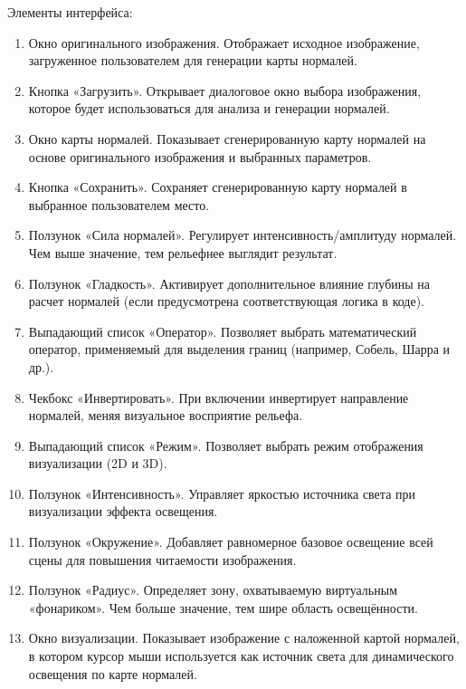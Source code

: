 Элементы интерфейса:
\begin{enumerate}
	\item Окно оригинального изображения. Отображает исходное изображение, загруженное пользователем для генерации карты нормалей.
	\item Кнопка «Загрузить». Открывает диалоговое окно выбора изображения, которое будет использоваться для анализа и генерации нормалей.	
	\item Окно карты нормалей. Показывает сгенерированную карту нормалей на основе оригинального изображения и выбранных параметров.
	\item Кнопка «Сохранить». Сохраняет сгенерированную карту нормалей в выбранное пользователем место.
	\item Ползунок «Сила нормалей». Регулирует интенсивность/амплитуду нормалей. Чем выше значение, тем рельефнее выглядит результат.
	\item Ползунок «Гладкость». Активирует дополнительное влияние глубины на расчет нормалей (если предусмотрена соответствующая логика в коде).
	\item Выпадающий список «Оператор». Позволяет выбрать математический оператор, применяемый для выделения границ (например, Собель, Шарра и др.).
	\item Чекбокс «Инвертировать». При включении инвертирует направление нормалей, меняя визуальное восприятие рельефа.
	\item Выпадающий список «Режим». Позволяет выбрать режим отображения визуализации (2D и 3D).	
	\item Ползунок «Интенсивность». Управляет яркостью источника света при визуализации эффекта освещения.
	\item Ползунок «Окружение». Добавляет равномерное базовое освещение всей сцены для повышения читаемости изображения.
	\item  Ползунок «Радиус». Определяет зону, охватываемую виртуальным «фонариком». Чем больше значение, тем шире область освещённости.
	\item Окно визуализации. Показывает изображение с наложенной картой нормалей, в котором курсор мыши используется как источник света для динамического освещения по карте нормалей.
\end{enumerate}
